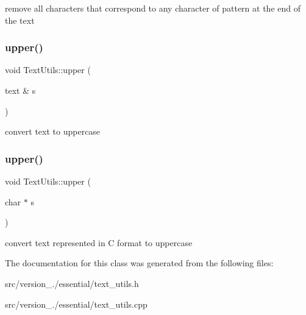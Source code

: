 remove all characters that correspond to any character of pattern at the end of the text \mbox{\label{classez_1_1essential_1_1TextUtils_a921ab014e15e604a3a768f4840b991c0}} 
\subsubsection{\texorpdfstring{upper()}{upper()}\hspace{0.1cm}{\footnotesize\ttfamily [1/2]}}
{\footnotesize\ttfamily void Text\+Utils\+::upper (\begin{DoxyParamCaption}\item[{text \&}]{s }\end{DoxyParamCaption})\hspace{0.3cm}{\ttfamily [static]}}

convert text to uppercase \mbox{\label{classez_1_1essential_1_1TextUtils_acdc8e1ff8d29b4ae7d62c5c4263a64b4}} 
\subsubsection{\texorpdfstring{upper()}{upper()}\hspace{0.1cm}{\footnotesize\ttfamily [2/2]}}
{\footnotesize\ttfamily void Text\+Utils\+::upper (\begin{DoxyParamCaption}\item[{char $\ast$}]{s }\end{DoxyParamCaption})\hspace{0.3cm}{\ttfamily [static]}}

convert text represented in C format to uppercase 

The documentation for this class was generated from the following files\+:\begin{DoxyCompactItemize}
\item 
src/version\+\_./essential/text\+\_\+utils.\+h\item 
src/version\+\_./essential/text\+\_\+utils.\+cpp\end{DoxyCompactItemize}
